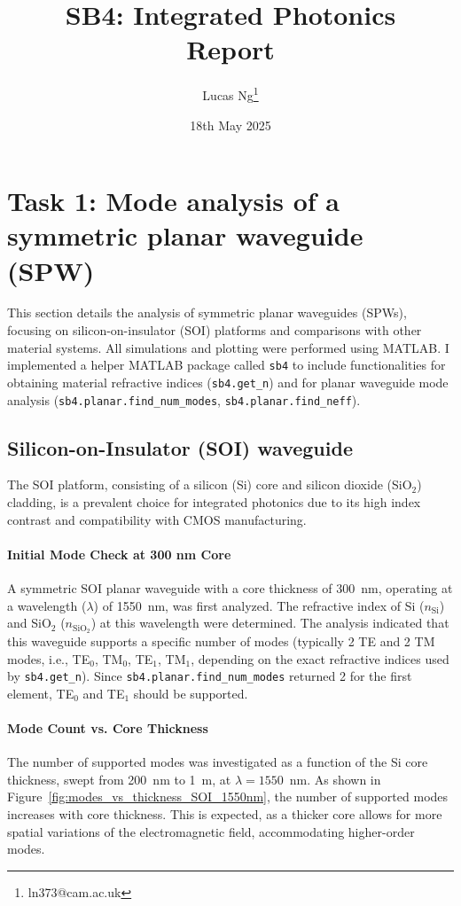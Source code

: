 \documentclass[10pt, a4paper]{article}
\title{\Large \bfseries SB4: Integrated Photonics\\[0.5em] \large Report}
\author{Lucas Ng\thanks{ln373@cam.ac.uk}}
\date{18th May 2025}
\begin{document}
\maketitle

\section{Task 1: Mode analysis of a symmetric planar waveguide (SPW)}
This section details the analysis of symmetric planar waveguides (SPWs), focusing on silicon-on-insulator (SOI) platforms and comparisons with other material systems. All simulations and plotting were performed using MATLAB. I implemented a helper MATLAB package called \texttt{sb4} to include functionalities for obtaining material refractive indices (\texttt{sb4.get\_n}) and for planar waveguide mode analysis (\texttt{sb4.planar.find\_num\_modes}, \texttt{sb4.planar.find\_neff}).

\subsection{Silicon-on-Insulator (SOI) waveguide}
The SOI platform, consisting of a silicon (Si) core and silicon dioxide (SiO$_2$) cladding, is a prevalent choice for integrated photonics due to its high index contrast and compatibility with CMOS manufacturing.

\paragraph{Initial Mode Check at 300 nm Core}
A symmetric SOI planar waveguide with a core thickness of 300~nm, operating at a wavelength ($\lambda$) of 1550~nm, was first analyzed. The refractive index of Si ($n_{\text{Si}}$) and SiO$_2$ ($n_{\text{SiO}_2}$) at this wavelength were determined. The analysis indicated that this waveguide supports a specific number of modes (typically 2 TE and 2 TM modes, i.e., TE$_0$, TM$_0$, TE$_1$, TM$_1$, depending on the exact refractive indices used by \texttt{sb4.get\_n}). Since \texttt{sb4.planar.find\_num\_modes} returned 2 for the first element, TE$_0$ and TE$_1$ should be supported.

\paragraph{Mode Count vs. Core Thickness}
The number of supported modes was investigated as a function of the Si core thickness, swept from 200~nm to 1~{\textmu}m, at $\lambda = 1550$~nm. As shown in Figure~\ref{fig:modes_vs_thickness_SOI_1550nm}, the number of supported modes increases with core thickness. This is expected, as a thicker core allows for more spatial variations of the electromagnetic field, accommodating higher-order modes.
\end{document}
